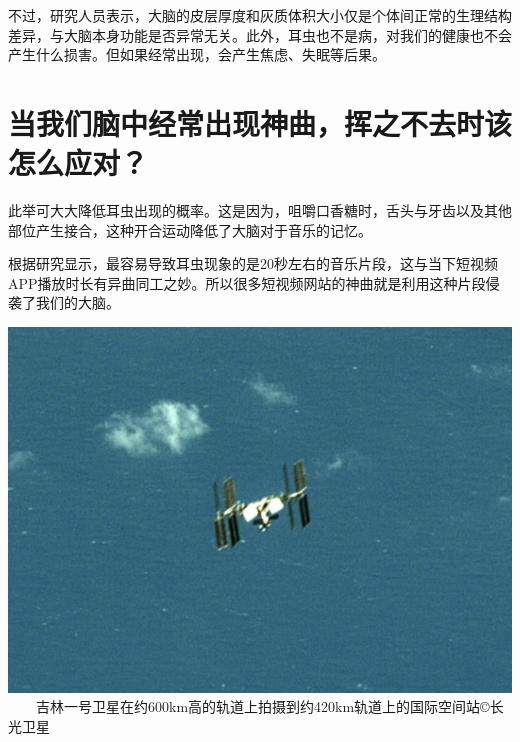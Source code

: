 \begin{multicols}{3}
不过，研究人员表示，大脑的皮层厚度和灰质体积大小仅是个体间正常的生理结构差异，与大脑本身功能是否异常无关。此外，耳虫也不是病，对我们的健康也不会产生什么损害。但如果经常出现，会产生焦虑、失眠等后果。

\section*{当我们脑中经常出现神曲，挥之不去时该怎么应对？}

此举可大大降低耳虫出现的概率。这是因为，咀嚼口香糖时，舌头与牙齿以及其他部位产生接合，这种开合运动降低了大脑对于音乐的记忆。



根据研究显示，最容易导致耳虫现象的是20秒左右的音乐片段，这与当下短视频APP播放时长有异曲同工之妙。所以很多短视频网站的神曲就是利用这种片段侵袭了我们的大脑。\EOA
\end{multicols}
\noindent\parbox{0.655\linewidth}{
}\hfill\parbox{0.305\linewidth}{\includegraphics[width=\linewidth,clip=true, trim=0 80 0 80]{IMG/202001/img-272cfeb00a40c9a09cc305f9fad5d934.jpg}\\\kaishu 　　吉林一号卫星在约600km高的轨道上拍摄到约420km轨道上的国际空间站\hfill\copyright 长光卫星}

\parbox{0.5\linewidth}{}